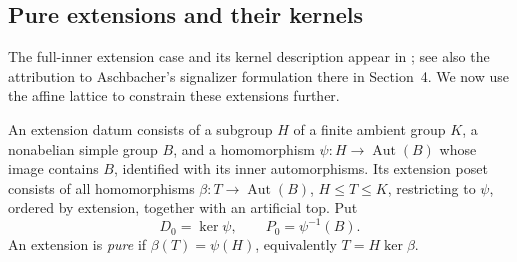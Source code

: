 \subsection{Pure extensions and their kernels}

The full-inner extension case and its kernel description appear in
\citet[Proposition~2.5 and Remark~2.6]{PalfyTwisted}; see also the
attribution to Aschbacher's signalizer formulation there in Section~4.
We now use the affine lattice to constrain these extensions further.

\begin{definition}\label{f:def-pure-extension}
An extension datum consists of a subgroup $H$ of a finite ambient group
$K$, a nonabelian simple group $B$, and a homomorphism
$\psi:H\to\operatorname{Aut}(B)$ whose image contains $B$, identified with
its inner automorphisms. Its extension poset consists of all homomorphisms
$\beta:T\to\operatorname{Aut}(B)$, $H\le T\le K$, restricting to $\psi$,
ordered by extension, together with an artificial top. Put
\[
 D_0=\ker\psi,\qquad P_0=\psi^{-1}(B).
\]
An extension is \emph{pure} if $\beta(T)=\psi(H)$, equivalently
$T=H\ker\beta$.
\end{definition}

